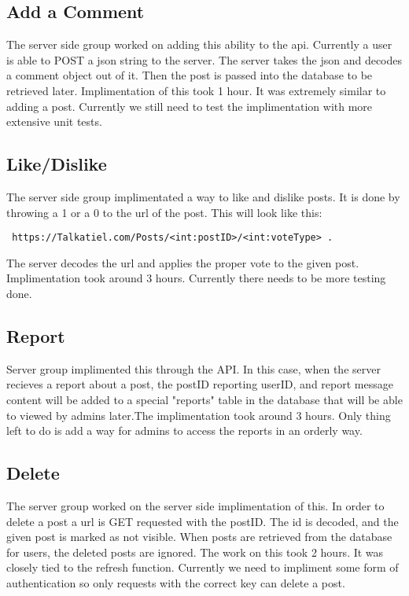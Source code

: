 \documentclass[12pt]{article}
\begin{document}
      \subsection{Add a Comment}
      The server side group worked on adding this ability to the api.  Currently a user is able to POST a json string to the server.  The server takes the json and decodes a comment object out of it.  Then the post is passed into the database to be retrieved later.  Implimentation of this took 1 hour.  It was extremely similar to adding a post.  Currently we still need to test the implimentation with more extensive unit tests.
      \subsection{Like/Dislike}
      The server side group implimentated a way to like and dislike posts.  It is done by throwing a 1 or a 0 to the url of the post.  This will look like this:\begin{verbatim} https://Talkatiel.com/Posts/<int:postID>/<int:voteType> .\end{verbatim}  The server decodes the url and applies the proper vote to the given post.  Implimentation took around 3 hours.  Currently there needs to be more testing done.
      \subsection{Report}
      Server group implimented this through the API.  In this case, when the server recieves a report about a post, the postID reporting userID, and report message content will be added to a special "reports" table in the database that will be able to viewed by admins later.The implimentation took around 3 hours.  Only thing left to do is add a way for admins to access the reports in an orderly way.
      \subsection{Delete}
      The server group worked on the server side implimentation of this.  In order to delete a post a url is GET requested with the postID.  The id is decoded, and the given post is marked as not visible.  When posts are retrieved from the database for users, the deleted posts are ignored.  The work on this took 2 hours.  It was closely tied to the refresh function.  Currently we need to impliment some form of authentication so only requests with the correct key can delete a post.
\end{document}
